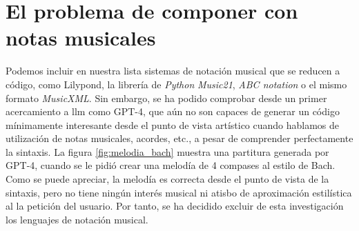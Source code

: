     
\section{El problema de componer con notas musicales}

Podemos incluir en nuestra lista sistemas de notación musical que se reducen a código, como Lilypond, la librería de \emph{Python} \emph{Music21}, \emph{ABC notation} o el mismo formato \emph{MusicXML}. Sin embargo, se ha podido comprobar desde un primer acercamiento a \gls{llm} como GPT-4, que aún no son capaces de generar un código mínimamente interesante desde el punto de vista artístico cuando hablamos de utilización de notas musicales, acordes, etc., a pesar de comprender perfectamente la sintaxis. La figura \ref{fig:melodia_bach} muestra una partitura generada por GPT-4, cuando se le pidió crear una melodía de 4 compases al estilo de Bach. Como se puede apreciar, la melodía es correcta desde el punto de vista de la sintaxis, pero no tiene ningún interés musical ni atisbo de aproximación estilística al la petición del usuario. Por tanto, se ha decidido excluir de esta investigación los lenguajes de notación musical.

